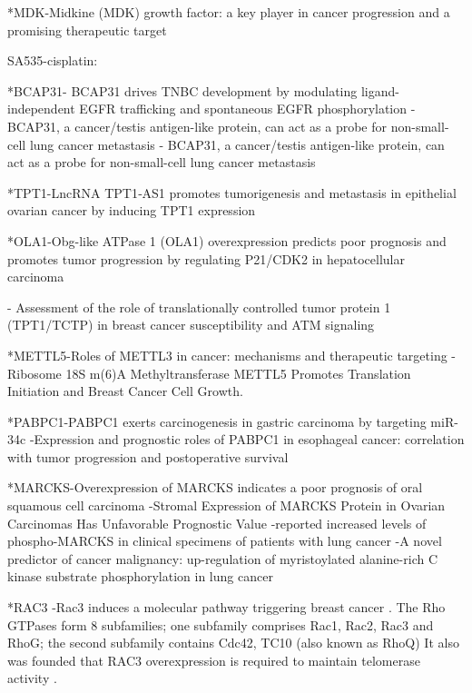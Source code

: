 *MDK-Midkine (MDK) growth factor: a key player in cancer progression and a promising therapeutic target

SA535-cisplatin:

*BCAP31- BCAP31 drives TNBC development by modulating ligand-independent EGFR trafficking and spontaneous EGFR phosphorylation
-BCAP31, a cancer/testis antigen-like protein, can act as a probe for non-small-cell lung cancer metastasis
- BCAP31, a cancer/testis antigen-like protein, can act as a probe for non-small-cell lung cancer metastasis

*TPT1-LncRNA TPT1‐AS1 promotes tumorigenesis and metastasis in epithelial ovarian cancer by inducing TPT1 expression

*OLA1-Obg-like ATPase 1 (OLA1) overexpression predicts poor prognosis and promotes tumor progression by regulating P21/CDK2 in hepatocellular carcinoma

- Assessment of the role of translationally controlled tumor protein 1 (TPT1/TCTP) in breast cancer susceptibility and ATM signaling

*METTL5-Roles of METTL3 in cancer: mechanisms and therapeutic targeting
- Ribosome 18S m(6)A Methyltransferase METTL5 Promotes Translation Initiation and Breast Cancer Cell Growth.

*PABPC1-PABPC1 exerts carcinogenesis in gastric carcinoma by targeting miR-34c
-Expression and prognostic roles of PABPC1 in esophageal cancer: correlation with tumor progression and postoperative survival

*MARCKS-Overexpression of MARCKS indicates a poor prognosis of oral squamous cell carcinoma
-Stromal Expression of MARCKS Protein in Ovarian
Carcinomas Has Unfavorable Prognostic Value
-reported increased levels of phospho-MARCKS in clinical specimens of patients with lung cancer
-A novel predictor of cancer malignancy: up-regulation of myristoylated alanine-rich C kinase substrate phosphorylation in lung cancer

*RAC3 -Rac3 induces a molecular pathway triggering breast cancer \cite{gest2013rac3}.
 The Rho GTPases form 8 subfamilies; one subfamily comprises Rac1, Rac2, Rac3 and RhoG; the second subfamily contains Cdc42, TC10 (also known as RhoQ)
 It also was founded that RAC3 overexpression is required to maintain telomerase activity \cite{larrosa2015rac3, chan2005roles}.













